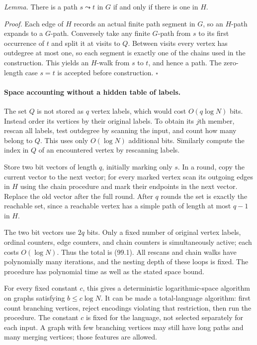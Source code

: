 \documentclass[11pt]{article}
\begin{document}
\emph{Lemma.} There is a path $s\leadsto t$ in $G$ if and only if there is one in $H$.

\emph{Proof.} Each edge of $H$ records an actual finite path segment in $G$, so an $H$-path expands to a $G$-path. Conversely take any finite $G$-path from $s$ to its first occurrence of $t$ and split it at visits to $Q$. Between visits every vertex has outdegree at most one, so each segment is exactly one of the chains used in the construction. This yields an $H$-walk from $s$ to $t$, and hence a path. The zero-length case $s=t$ is accepted before construction. \hfill$\square$

\paragraph{Space accounting without a hidden table of labels.}
The set $Q$ is not stored as $q$ vertex labels, which would cost $O(q\log N)$ bits. Instead order its vertices by their original labels. To obtain its $j$th member, rescan all labels, test outdegree by scanning the input, and count how many belong to $Q$. This uses only $O(\log N)$ additional bits. Similarly compute the index in $Q$ of an encountered vertex by rescanning labels.

Store two bit vectors of length $q$, initially marking only $s$. In a round, copy the current vector to the next vector; for every marked vertex scan its outgoing edges in $H$ using the chain procedure and mark their endpoints in the next vector. Replace the old vector after the full round. After $q$ rounds the set is exactly the reachable set, since a reachable vertex has a simple path of length at most $q-1$ in $H$.

The two bit vectors use $2q$ bits. Only a fixed number of original vertex labels, ordinal counters, edge counters, and chain counters is simultaneously active; each costs $O(\log N)$. Thus the total is (99.1). All rescans and chain walks have polynomially many iterations, and the nesting depth of these loops is fixed. The procedure has polynomial time as well as the stated space bound.

For every fixed constant $c$, this gives a deterministic logarithmic-space algorithm on graphs satisfying $b\le c\log N$. It can be made a total-language algorithm: first count branching vertices, reject encodings violating that restriction, then run the procedure. The constant $c$ is fixed for the language, not selected separately for each input. A graph with few branching vertices may still have long paths and many merging vertices; those features are allowed.
\end{document}
